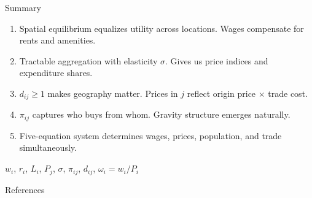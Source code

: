 \documentclass{beamer}
\begin{document}
\begin{frame}{Summary}

    \begin{enumerate}
        \item {} Spatial equilibrium equalizes utility across locations. Wages compensate for rents and amenities.
        \item {} Tractable aggregation with elasticity $\sigma$. Gives us price indices and expenditure shares.
        \item {} $d_{ij} \geq 1$ makes geography matter. Prices in $j$ reflect origin price $\times$ trade cost.
        \item {} $\pi_{ij}$ captures who buys from whom. Gravity structure emerges naturally.
        \item {} Five-equation system determines wages, prices, population, and trade simultaneously.
    \end{enumerate}

    \vspace{0.5em}
     $w_i$, $r_i$, $L_i$, $P_j$, $\sigma$, $\pi_{ij}$, $d_{ij}$, $\omega_i = w_i/P_i$

\end{frame}


\begin{frame}[allowframebreaks]{References}
    
    
\end{frame}
\end{document}
